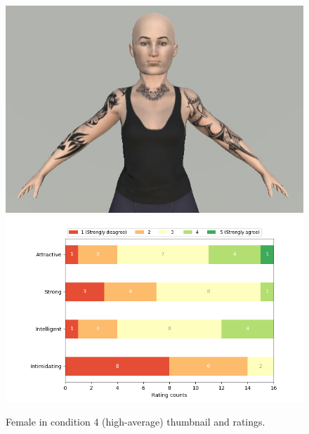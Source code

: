 \begin{figure}[H]
  \includegraphics[width=\linewidth]{Images/Females/5.JPG}
\endminipage\hfill
{}
  \includegraphics[width=\linewidth]{Survey/avatar_f_experiment4.png}
\endminipage\hfill
\caption{Female in condition 4 (high-average) thumbnail and ratings.}
\end{figure}

